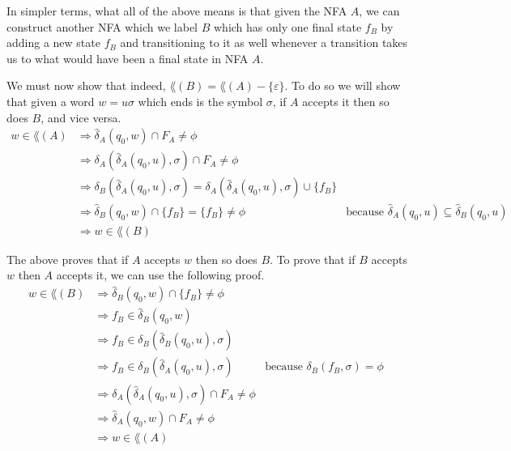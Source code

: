 \documentclass[fleqn]{article}
\begin{document}
\begin{answers}
\begin{enumerate}
				In simpler terms, what all of the above means is that given the NFA \(A\), we can construct another NFA which we label \(B\) which has only one final state \(f_B\) by adding a new state \(f_B\) and transitioning to it as well whenever a transition takes us to  what would have been a final state in NFA \(A\).

				We must now show that indeed, \(\lang(B) = \lang(A) - \{\varepsilon\}\). To do so we will show that given a word \(w = u\sigma\) which ends is the symbol \(\sigma\), if \(A\) accepts it then so does \(B\), and vice versa.
				\begin{align*}
					w \in \lang(A) & \Rightarrow \hat{\delta}_A(q_0, w) \cap F_A \neq \phi \\
					               & \Rightarrow \delta_A(\hat{\delta}_A(q_0, u), \sigma) \cap F_A \neq \phi \\
					               & \Rightarrow \delta_B(\hat{\delta}_A(q_0, u), \sigma) = \delta_A(\hat{\delta}_A(q_0, u), \sigma) \cup \{f_B\} \\
					               & \Rightarrow \hat{\delta}_B(q_0, w) \cap \{f_B\} = \{f_B\} \neq \phi                                          & \text{because } \hat{\delta}_A(q_0, u) \subseteq \hat{\delta}_B(q_0, u) & \\
					               & \Rightarrow w \in \lang(B)
				\end{align*}

				The above proves that if \(A\) accepts \(w\) then so does \(B\). To prove that if \(B\) accepts \(w\) then \(A\) accepts it, we can use the following proof.
				\begin{align*}
					w \in \lang(B) & \Rightarrow \hat{\delta}_B(q_0, w) \cap \{f_B\} \neq \phi \\
					               & \Rightarrow f_B \in \hat{\delta}_B(q_0, w) \\
					               & \Rightarrow f_B \in \delta_B(\hat{\delta}_B(q_0, u), \sigma) \\
					               & \Rightarrow f_B \in \delta_B(\hat{\delta}_A(q_0, u), \sigma)            & \text{because } \delta_B(f_B, \sigma) = \phi & \\
					               & \Rightarrow \delta_A(\hat{\delta}_A(q_0, u), \sigma) \cap F_A \neq \phi \\
					               & \Rightarrow \hat{\delta}_A(q_0, w) \cap F_A \neq \phi \\
					               & \Rightarrow w \in \lang (A)
				\end{align*}


\end{enumerate}
\end{answers}
\end{document}
